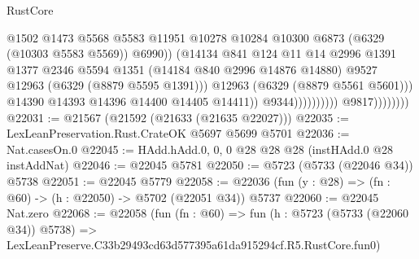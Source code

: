 \begin{lexlean}{RustCore}
\begin{coremodule}
                                                  @1502
                                                  @1473
                                                  @5568
                                                  @5583
                                                  @11951
                                                  @10278
                                                  @10284
                                                  @10300
                                                  @6873
                                                  (@6329 (@10303 @5583 @5569))
                                                  @6990))
                                              (@14134
                                                @841
                                                @124
                                                @11
                                                @14
                                                @2996
                                                @1391
                                                @1377
                                                @2346
                                                @5594
                                                @1351
                                                (@14184 @840 @2996 @14876 @14880)
                                                @9527
                                                @12963
                                                (@6329 (@8879 @5595 @1391)))
                                              @12963
                                              (@6329 (@8879 @5561 @5601)))
                                            @14390
                                            @14393
                                            @14396
                                            @14400
                                            @14405
                                            @14411))
                                        @9344))))))))))
                    @9817))))))))
@22031 := @21567 (@21592 (@21633 (@21635 @22027)))
@22035 := LexLeanPreservation.Rust.CrateOK @5697 @5699 @5701
@22036 := Nat.casesOn.{0}
@22045 := HAdd.hAdd.{0, 0, 0} @28 @28 @28 (instHAdd.{0} @28 instAddNat)
@22046 := @22045 @5781
@22050 := @5723 (@5733 (@22046 @34)) @5738
@22051 := @22045 @5779
@22058 := @22036 (fun (y : @28) => (fn : @60) -> (h : @22050) -> @5702 (@22051 @34)) @5737
@22060 := @22045 Nat.zero
@22068 := @22058
    (fun (fn : @60) =>
    fun (h : @5723 (@5733 (@22060 @34)) @5738) =>
    LexLeanPreserve.C33b29493cd63d577395a61da915294cf.R5.RustCore.fun0)

\end{coremodule}
\end{lexlean}
